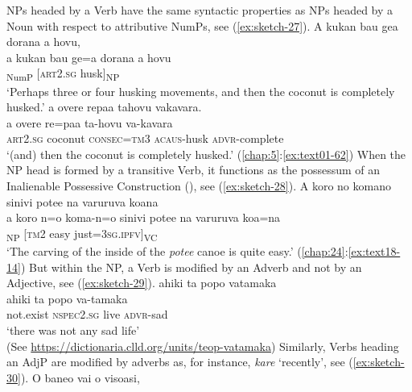 \documentclass[output=paper]{langscibook}
\begin{document}
NPs headed by a Verb have the same syntactic properties as NPs headed by a Noun with respect to attributive NumPs, see (\ref{ex:sketch-27}).
\ea\label{ex:sketch-27}
\ea\label{ex:sketch-27a}
    A kukan bau gea dorana a hovu,\\
    \gll a	kukan	bau	ge=a	dorana	a	hovu\\
    [\textsc{art}2.\textsc{sg}	three	perhaps	or=\textsc{art}2.\textsc{sg}	four]\textsubscript{NumP}	[\textsc{art}2.\textsc{sg}	husk]\textsubscript{NP}\\
    \glt `Perhaps three or four husking movements, and then the coconut is completely husked.'
\ex\label{ex:sketch-27b}
    a overe repaa tahovu vakavara.\\
    \gll a	overe	re=paa	ta-hovu	va-kavara\\
    \textsc{art}2.\textsc{sg}	coconut	\textsc{consec}=\textsc{tm}3	\textsc{acaus}-husk	\textsc{advr}-complete\\
    \glt `(and) then the coconut is completely husked.' (\ref{chap:5}:\ref{ex:text01-62})
\z
\z
When the NP head is formed by a transitive Verb, it functions as the possessum of an Inalienable Possessive Construction (), see (\ref{ex:sketch-28}).
\ea\label{ex:sketch-28}
    A koro no komano sinivi potee na varuruva koana\\
    \gll a	koro	n=o	koma-n=o	sinivi	potee	na	varuruva	koa=na\\
    [\textsc{art}2.\textsc{sg}	carve.out	3\textsc{sg}.\textsc{poss}=\textsc{art}3.\textsc{sg}	inside-3\textsc{sg}.\textsc{poss}=\textsc{art}3.\textsc{sg}	canoe	potee]\textsubscript{NP}	[\textsc{tm}2	easy	just=3\textsc{sg}.\textsc{ipfv}]\textsubscript{VC}\\
    \glt `The carving of the inside of the \textit{potee} canoe is quite easy.' (\ref{chap:24}:\ref{ex:text18-14}) 
\z
But within the NP, a Verb is modified by an Adverb and not by an Adjective, see (\ref{ex:sketch-29}).
\ea\label{ex:sketch-29}
    ahiki ta popo vatamaka\\
    \gll ahiki ta popo va-tamaka\\
    not.exist \textsc{nspec}2.\textsc{sg} live \textsc{advr}-sad\\
    \glt `there was not any sad life' \\\hfill(See \url{https://dictionaria.clld.org/units/teop-vatamaka})
\z
Similarly, Verbs heading an AdjP are modified by adverbs as, for instance, \textit{kare} `recently', see (\ref{ex:sketch-30}).
\ea\label{ex:sketch-30}
\ea\label{ex:sketch-30a}
    O baneo vai o visoasi,\\
\end{document}
